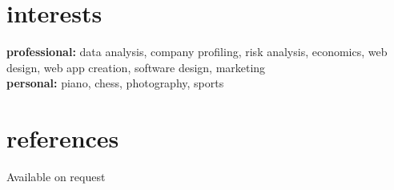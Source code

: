 \documentclass[]{friggeri-cv} %
\begin{document}

\section{interests}

\textbf{professional:} data analysis, company profiling, risk analysis, economics, web design, web app creation, software design, marketing  \\
\textbf{personal:} piano, chess, photography, sports


\section{references}

Available on request
\end{document}
